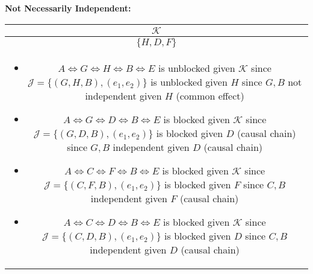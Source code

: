 \begin{example}
    \textbf{Not Necessarily Independent:}
    \begin{center}
        \begin{tabular}{c}
            \toprule
            $\mathcal{K}$ \\
            \midrule
            $\{H,D,F\}$ \\
            \multicolumn{1}{p{\linewidth}}{
                \begin{itemize}
                    \item $A \iff G \iff H \iff B \iff E$ is unblocked given $\mathcal{K}$ since $\mathcal{J} = \{(G,H,B),(e_1,e_2)\}$ is unblocked given $H$ since $G,B$ not independent given $H$ (common effect)
                    \item $A \iff G \iff D \iff B \iff E$ is blocked given $\mathcal{K}$ since $\mathcal{J} = \{(G,D,B),(e_1,e_2)\}$ is blocked given $D$ (causal chain) since $G,B$ independent given $D$ (causal chain)
                    \item $A \iff C \iff F \iff B \iff E$ is blocked given $\mathcal{K}$ since $\mathcal{J} = \{(C,F,B),(e_1,e_2)\}$ is blocked given $F$ since $C,B$ independent given $F$ (causal chain)
                    \item $A \iff C \iff D \iff B \iff E$  is blocked given $\mathcal{K}$ since $\mathcal{J} = \{(C,D,B),(e_1,e_2)\}$ is blocked given $D$ since $C,B$ independent given $D$ (causal chain)
                \end{itemize}} \\
            \midrule
            \toprule
        \end{tabular}
    \end{center}
\end{example}
\newpage

